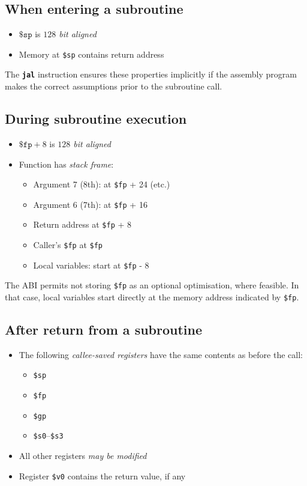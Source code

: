 \documentclass{article}
\newcommand{\insn}[1]{\texttt{\textbf{\textcolor{dblue}{#1}}}}
\begin{document}
\subsection{When entering a subroutine}
    \begin{itemize}
    \item $\texttt{\$sp}$ is \emph{$128$ bit aligned}
    \item Memory at \texttt{\$sp} contains return address
    \end{itemize}

    The \insn{jal} instruction ensures these properties implicitly if the assembly
    program makes the correct assumptions prior to the subroutine call.

\subsection{During subroutine execution}
    \begin{itemize}
    \item $\texttt{\$fp} + 8$ is \emph{$128$ bit aligned}
    \item Function has \emph{stack frame}:
      \begin{itemize}
        \item Argument 7 (8th): at \texttt{\$fp} + 24 (etc.)
        \item Argument 6 (7th): at \texttt{\$fp} + 16
        \item Return address at \texttt{\$fp} + 8
        \item Caller's \texttt{\$fp} at \texttt{\$fp}
        \item Local variables: start at \texttt{\$fp} - 8
      \end{itemize}
    \end{itemize}

    The ABI permits not storing \texttt{\$fp} as an optional
    optimisation, where feasible.  
    In that case, local variables start directly
    at the memory address indicated by \texttt{\$fp}.

\subsection{After return from a subroutine}
  \begin{itemize}
    \item The following \emph{callee-saved registers} have the same contents as before the call:
      \begin{itemize}
        \item \texttt{\$sp}
        \item \texttt{\$fp}
        \item \texttt{\$gp}
        \item \texttt{\$s0}--\texttt{\$s3}
      \end{itemize}
    \item All other registers \emph{may be modified}
    \item Register \texttt{\$v0} contains the return value, if any
  \end{itemize}
\end{document}
